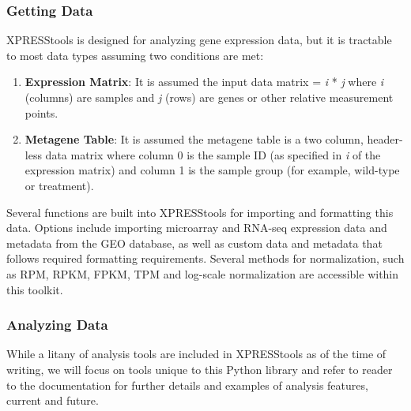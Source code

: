 \documentclass[11pt, a4paper, oneside]{article}
\begin{document}
\subsubsection{Getting Data}
XPRESStools is designed for analyzing gene expression data, but it is tractable to most data types assuming two conditions are met:

\begin{enumerate}
  \item \textbf{Expression Matrix}: It is assumed the input data matrix = \textit{i} * \textit{j} where \textit{i} (columns) are samples and \textit{j} (rows) are genes or other relative measurement points.
  \item \textbf{Metagene Table}: It is assumed the metagene table is a two column, header-less data matrix where column 0 is the sample ID (as specified in \textit{i} of the expression matrix) and column 1 is the sample group (for example, wild-type or treatment).
\end{enumerate}

Several functions are built into XPRESStools for importing and formatting this data. Options include importing microarray and RNA-seq expression data and metadata from the GEO database, as well as custom data and metadata that follows required formatting requirements. Several methods for normalization, such as RPM, RPKM, FPKM, TPM and log-scale normalization are accessible within this toolkit.

\subsubsection{Analyzing Data}

While a litany of analysis tools are included in XPRESStools as of the time of writing, we will focus on tools unique to this Python library and refer to reader to the documentation for further details and examples of analysis features, current and future.
\end{document}
